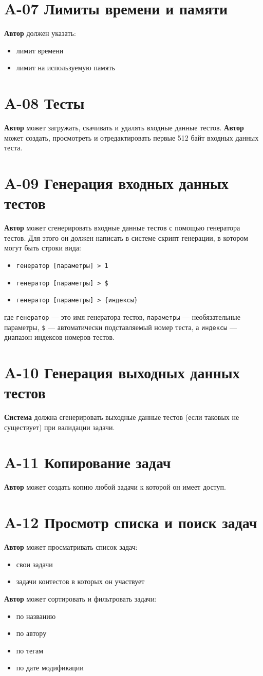\documentclass{book}
\newcommand{\newcard}[1]{\newpage \section*{#1}}
\begin{document}
\newcard{A-07 Лимиты времени и памяти}
\textbf{Автор} должен указать:
\begin{itemize}\setlength{\itemsep}{0pt}
	\item лимит времени
	\item лимит на используемую память
\end{itemize}


\newcard{A-08 Тесты}
\textbf{Автор} может загружать, скачивать и удалять входные данные тестов.
\textbf{Автор} может создать, просмотреть и отредактировать первые 512 байт входных данных теста.


\newcard{A-09 Генерация входных данных тестов}
\textbf{Автор} может сгенерировать входные данные тестов с помощью генератора тестов. Для этого он должен написать в системе скрипт генерации, в котором могут быть строки вида:
\begin{itemize}\setlength{\itemsep}{0pt}
	\item \texttt{генератор [параметры] > 1}
	\item \texttt{генератор [параметры] > \$}
	\item \texttt{генератор [параметры] > \{индексы\}}
\end{itemize}
где \texttt{генератор} — это имя генератора тестов, \texttt{параметры} — необязательные параметры, \texttt{\$} — автоматически подставляемый номер теста, а \texttt{индексы} — диапазон индексов номеров тестов.


\newcard{A-10 Генерация выходных данных тестов}
\textbf{Система} должна сгенерировать выходные данные тестов (если таковых не существует) при валидации задачи.


\newcard{A-11 Копирование задач}
\textbf{Автор} может создать копию любой задачи к которой он имеет доступ.


\newcard{A-12 Просмотр списка и поиск задач}
\textbf{Автор} может просматривать список задач:
\begin{itemize}\setlength{\itemsep}{0pt}
	\item свои задачи
	\item задачи контестов в которых он участвует 
\end{itemize}

\textbf{Автор} может сортировать и фильтровать задачи:
\begin{itemize}\setlength{\itemsep}{0pt}
	\item по названию
	\item по автору
	\item по тегам
	\item по дате модификации 
\end{itemize}
\end{document}
